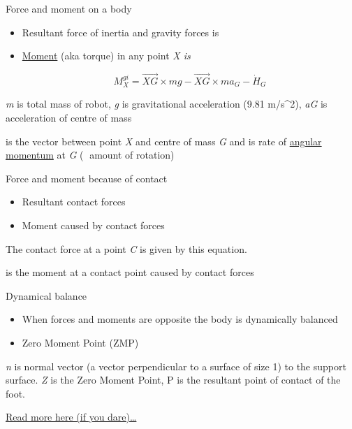 \documentclass[compress]{beamer}
\begin{document}
\begin{frame}{Force and moment on a body}

    \begin{itemize}

        \item Resultant force of inertia and gravity forces is
        \item \href{http://en.wikipedia.org/wiki/Moment_of_force}{Moment} (aka
            torque) in any point \emph{X is}

            \[
                M^{gi}_X = \vec{XG} \times mg - \vec{XG} \times ma_G - \dot{H}_G
                \]
    \end{itemize}

    \emph{m} is total mass of robot, \emph{g} is gravitational acceleration
    (9.81 m/s\^{}2), \emph{aG} is acceleration of centre of mass

    is the vector between point \emph{X} and centre of mass \emph{G} and
    \emph{} is rate of
    \href{http://en.wikipedia.org/wiki/Angular_momentum}{angular momentum}
    at \emph{G} ( amount of rotation)

\end{frame}

\begin{frame}{Force and moment because of contact}

    \begin{itemize}

        \item Resultant contact forces
        \item Moment caused by contact forces
    \end{itemize}

    The contact force at a point \emph{C} is given by this equation.

    is the moment at a contact point caused by contact forces

\end{frame}

\begin{frame}{Dynamical balance}

    \begin{itemize}

        \item When forces and moments are opposite the body is dynamically balanced
        \item Zero Moment Point (ZMP)
    \end{itemize}

    \emph{n} is normal vector (a vector perpendicular to a surface of size
    1) to the support surface. \emph{Z} is the Zero Moment Point, P is the
    resultant point of contact of the foot.

    \href{http://ieeexplore.ieee.org/stamp/stamp.jsp?tp=\&arnumber=1325327}{Read
    more here (if you dare)\ldots{}}

\end{frame}
\end{document}
